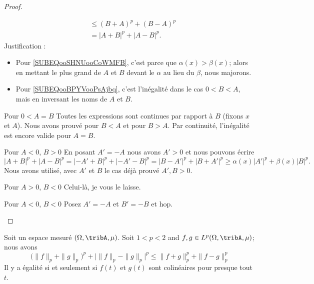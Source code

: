 \begin{proof}
\begin{subproof}
\begin{subequations}
\begin{align}
                    &\leq (B+A)^p+(B-A)^p       \label{SUBEQooBPYVooPsAjbq}\\
                    &=| A+B |^p+| A-B |^p.
                \end{align}
            \end{subequations}
            Justification :
            \begin{itemize}
                \item Pour \eqref{SUBEQooSHNUooCoWMFB}, c'est parce que \( \alpha(x)>\beta(x)\); alors en mettant le plus grand de \( A\) et \( B\) devant le \( \alpha\) au lieu du \( \beta\), nous majorons.
                \item Pour \eqref{SUBEQooBPYVooPsAjbq}, c'est l'inégalité dans le cas \( 0<B<A\), mais en inversant les noms de \( A\) et \( B\).
            \end{itemize}
        \item[Pour \( 0<A=B\)]
            Toutes les expressions sont continues par rapport à \( B\) (fixons \( x\) et \( A\)). Nous avons prouvé pour \( B<A\) et pour \( B>A\). Par continuité, l'inégalité est encore valide pour \( A=B\).
        \item[Pour \( A<0\), \( B>0\)]
            En posant \( A'=-A\) nous avons \( A'>0\) et nous pouvons écrire
            \begin{equation}
                | A+B |^p+| A-B |^p=| -A'+B |^p+| -A'-B |^p=| B-A' |^p+| B+A' |^p\geq \alpha(x)| A' |^p+\beta(x)| B |^p.
            \end{equation}
            Nous avons utilisé, avec \( A'\) et \( B\) le cas déjà prouvé \( A',B>0\).
        \item[Pour \( A>0\), \( B<0\)]
            Celui-là, je vous le laisse.
        \item[Pour \( A<0\), \( B<0\)]
            Posez \( A'=-A\) et \( B'=-B\) et hop.
    \end{subproof}
\end{proof}


\begin{theorem}       \label{THOooZRRYooBTBQKW}
    Soit un espace mesuré \(  (\Omega,\tribA,\mu)\). Soit \( 1<p<2\) and \( f,g\in L^p(\Omega,\tribA,\mu)\); nous avons
    \begin{equation}
        \big( \| f \|_p+\| g \|_p \big)^p+\Big| \| f \|_p-\| g \|_p \Big|^p
                \leq \| f+g \|_p^p+\| f-g \|_p^p
    \end{equation}
    Il y a égalité si et seulement si \( f(t) \) et \( g(t)\) sont colinéaires pour presque tout \( t\).
\end{theorem}

